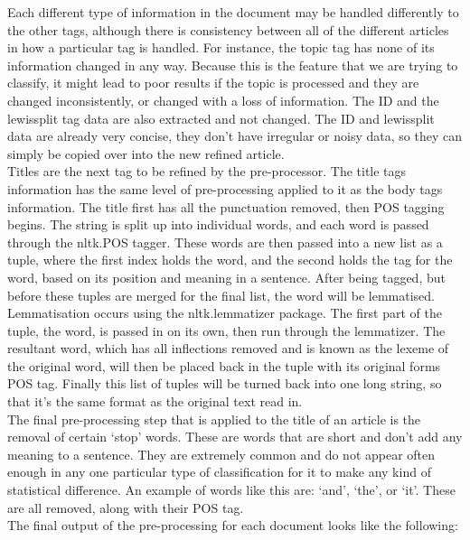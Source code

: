 \documentclass[11pt]{article}
\begin{document}
Each different type of information in the document may be handled differently to the other tags, although there is consistency between all of the different articles in how a particular tag is handled. For instance, the topic tag has none of its information changed in any way. Because this is the feature that we are trying to classify, it might lead to poor results if the topic is processed and they are changed inconsistently, or changed with a loss of information. The ID and the lewissplit tag data are also extracted and not changed. The ID and lewissplit data are already very concise, they don't have irregular or noisy data, so they can simply be copied over into the new refined article. \\

Titles are the next tag to be refined by the pre-processor. The title tags information has the same level of pre-processing applied to it as the body tags information. The title first has all the punctuation removed, then POS tagging begins. The string is split up into individual words, and each word is passed through the nltk.POS tagger. These words are then passed into a new list as a tuple, where the first index holds the word, and the second holds the tag for the word, based on its position and meaning in a sentence. After being tagged, but before these tuples are merged for the final list, the word will be lemmatised. \\

Lemmatisation occurs using the nltk.lemmatizer package. The first part of the tuple, the word, is passed in on its own, then run through the lemmatizer. The resultant word, which has all inflections removed and is known as the lexeme of the original word, will then be placed back in the tuple with its original forms POS tag. Finally this list of tuples will be turned back into one long string, so that it’s the same format as the original text read in. \\

The final pre-processing step that is applied to the title of an article is the removal of certain ‘stop’ words. These are words that are short and don’t add any meaning to a sentence. They are extremely common and do not appear often enough in any one particular type of classification for it to make any kind of statistical difference. An example of words like this are: ‘and’, ‘the’, or ‘it’. These are all removed, along with their POS tag. \\

The final output of the pre-processing for each document looks like the following:
\end{document}
